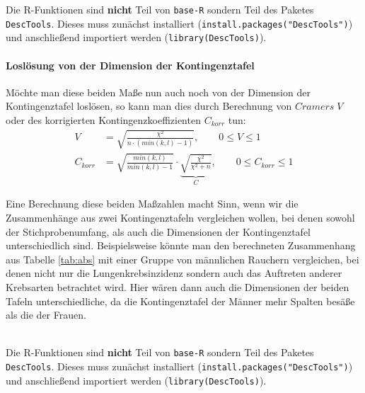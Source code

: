 \documentclass[a4paper]{article}
\newcommand\dangersign[1][2ex]{%
  \renewcommand\stacktype{L}%
  \scaleto{\stackon[1.3pt]{\color{red}$\triangle$}{\tiny !}}{#1}%
}
\begin{document}
\noindent \dangersign[3ex] Die R-Funktionen sind \textbf{nicht} Teil von \texttt{base-R} sondern Teil des Paketes \texttt{DescTools}. Dieses muss zunächst installiert (\texttt{install.packages("DescTools")}) und anschließend importiert werden (\texttt{library(DescTools)}).

\paragraph{Loslösung von der Dimension der Kontingenztafel}
Möchte man diese beiden Maße nun auch noch von der Dimension der Kontingenztafel loslösen, so kann man dies durch Berechnung von $Cramers\; V$ oder des korrigierten Kontingenzkoeffizienten $C_{korr}$ tun:
\begin{align*}
    V &= \sqrt{\frac{\chi^2}{n\cdot(min(k,l)-1)}}, \qquad 0 \leq V \leq 1\\
    C_{korr} &= \sqrt{\frac{min(k,l)}{min(k,l)-1}}\cdot\underbrace{\sqrt{\frac{\chi^2}{\chi^2 + n}}}_{C}, \qquad 0 \leq C_{korr} \leq 1
\end{align*}

\noindent Eine Berechnung diese beiden Maßzahlen macht Sinn, wenn wir die Zusammenhänge aus zwei Kontingenztafeln vergleichen wollen, bei denen sowohl der Stichprobenumfang, als auch die Dimensionen der Kontingenztafel unterschiedlich sind. Beispielsweise könnte man den berechneten Zusammenhang aus Tabelle \ref{tab:abs} mit einer Gruppe von männlichen Rauchern vergleichen, bei denen nicht nur die Lungenkrebsinzidenz sondern auch das Auftreten anderer Krebsarten betrachtet wird. Hier wären dann auch die Dimensionen der beiden Tafeln unterschiedliche, da die Kontingenztafel der Männer mehr Spalten besäße als die der Frauen.\\

\noindent  {}\\
\noindent  {}

\noindent \dangersign[3ex] Die R-Funktionen sind \textbf{nicht} Teil von \texttt{base-R} sondern Teil des Paketes \texttt{DescTools}. Dieses muss zunächst installiert (\texttt{install.packages("DescTools")}) und anschließend importiert werden (\texttt{library(DescTools)}).
\end{document}

